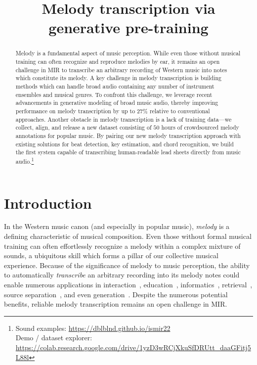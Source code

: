 \documentclass{article}
\title{
Melody transcription via generative pre-training
}
\begin{document}
\maketitle

\begin{abstract}
Melody 
is a fundamental aspect 
of 
music perception. 
While even those without musical training can often recognize and reproduce melodies by ear, it remains an open challenge in MIR to transcribe an arbitrary recording of Western music into notes which constitute its melody. 
A key challenge in melody transcription is building methods which can handle broad audio containing any number of instrument ensembles and musical genres. 
To confront this challenge, we leverage recent advancements in generative modeling of broad music audio, thereby improving performance on melody transcription by up to $27$\% relative to conventional approaches. 
Another obstacle in melody transcription is a lack of training data---we collect, align, and release a new dataset consisting of $50$ hours of crowdsourced melody annotations for popular music. 
By pairing our new melody transcription approach with existing solutions for beat detection, key estimation, and chord recognition, 
we build the first system capable of transcribing human-readable lead sheets directly from music audio.\footnote{Sound examples: \url{https://dblblnd.github.io/ismir22} \\
Demo / dataset explorer: \url{https://colab.research.google.com/drive/1yzD3wRCjXkuSfDRUtt_daaGFitj5L88l}}
\end{abstract}


\section{Introduction}\label{sec:introduction}

In the Western music canon (and especially in popular music), 
\emph{melody} is a defining characteristic of musical composition. 
Even those without formal musical training can often effortlessly recognize a melody within a complex mixture of sounds, 
a ubiquitous skill which forms a pillar of our collective musical experience. %
Because of the significance of melody to music perception, 
the ability to automatically \emph{transcribe} an arbitrary recording into 
its melody notes 
could enable numerous applications in 
interaction~\cite{ryynanen2008accompaniment}, 
education~\cite{droe2006music}, 
informatics~\cite{bainbridge1999towards}, 
retrieval~\cite{ghias1995query}, 
source separation~\cite{ewert2014score},
and even generation~\cite{hawthorne2019enabling}.
Despite the numerous potential benefits, 
reliable melody transcription remains an open challenge in MIR.
\end{document}
